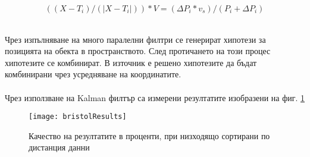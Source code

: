 \centerline{\begin{equation} \label{kalman}
    ((X-T_i)/ (|X-T_i|)) * V = (\Delta P_i * v_s) / (P_i + \Delta P_i)
\end{equation}}\\

Чрез изпълняване на много паралелни филтри се генерират хипотези за позицията на обекта в пространството. След протичането на този процес хипотезите се комбинират. В източник \cite{bristolBeacons} е решено хипотезите да бъдат комбинирани чрез усредняване на координатите. \\


 \\
Чрез използване на Kalman филтър са измерени резултатите изобразени на фиг. \ref{fig:bristolResults}

\begin{figure}
    \centering
    \centerline{\texttt{[image: bristolResults]}}
    \caption{Качество на резултатите в проценти, при низходящо сортирани по дистанция данни}
    \label{fig:bristolResults}
\end{figure}